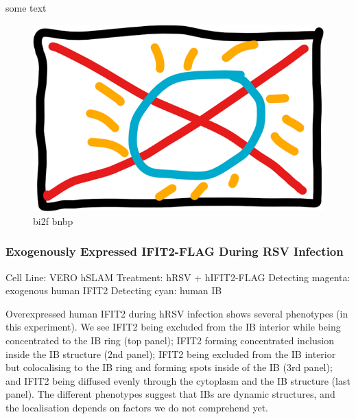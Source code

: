 some text

\begin{figure}
    \centering
    \includegraphics[width=0.5\linewidth]{09. Chapter 4//Figs//03. IFIT2-FLAG/00. placeholder.png}
    \caption[bi2f bnbp]{bi2f bnbp}
    \label{bi2f bnbp}
\end{figure}

\subsubsection{Exogenously Expressed IFIT2-FLAG During RSV Infection} \label{Exogenously Expressed IFIT2-FLAG During RSV Infection}
Cell Line: VERO hSLAM \newline
Treatment: hRSV + hIFIT2-FLAG \newline
Detecting magenta: exogenous human IFIT2 \newline
Detecting cyan: human IB \newline

Overexpressed human IFIT2 during hRSV infection shows several phenotypes (in this experiment). We see IFIT2 being excluded from the IB interior while being concentrated to the IB ring (top panel); IFIT2 forming concentrated inclusion inside the IB structure (2nd panel); IFIT2 being excluded from the IB interior but colocalising to the IB ring and forming spots inside of the IB (3rd panel); and IFIT2 being diffused evenly through the cytoplasm and the IB structure (last panel). The different phenotypes suggest that IBs are dynamic structures, and the localisation depends on factors we do not comprehend yet. 

